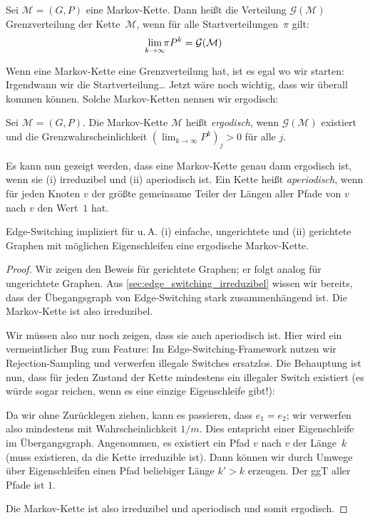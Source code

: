 \begin{definition}
    Sei $\mathcal M = (G, P)$ eine Markov-Kette.
    Dann heißt die Verteilung $\mathcal G(\mathcal M)$ Grenzverteilung der Kette~$\mathcal M$, wenn für alle Startverteilungen~$\pi$ gilt:
    \begin{equation}
        \smashoperator{\lim_{k \to \infty}} \pi P^k = \mathcal G(\mathcal M)
    \end{equation}
\end{definition}

Wenn eine Markov-Kette eine Grenzverteilung hat, ist es egal wo wir starten:
Irgendwann  wir die Startverteilung\dots
Jetzt wäre noch wichtig, dass wir überall  kommen können.
Solche Markov-Ketten nennen wir ergodisch:

\begin{definition}
    Sei $\mathcal M = (G, P)$. Die Markov-Kette $\mathcal M$ heißt \emph{ergodisch}, wenn $\mathcal G(\mathcal M)$ existiert und die Grenzwahrscheinlichkeit $(\lim_{k \to \infty} P^k)_j > 0$ für alle $j$.
\end{definition}

Es kann nun gezeigt werden, dass eine Markov-Kette genau dann ergodisch ist, wenn sie (i) irreduzibel und (ii) aperiodisch ist.
Ein Kette heißt \emph{aperiodisch}, wenn für jeden Knoten $v$ der größte gemeinsame Teiler der Längen aller Pfade von $v$ nach $v$ den Wert~$1$ hat.

\begin{theorem}
    Edge-Switching impliziert für u.\,A. (i) einfache, ungerichtete und (ii) gerichtete Graphen mit möglichen Eigenschleifen eine ergodische Markov-Kette.
\end{theorem}

\begin{proof}
    Wir zeigen den Beweis für gerichtete Graphen; er folgt analog für ungerichtete Graphen.
    Aus \cref{sec:edge_switching_irreduzibel} wissen wir bereits, dass der Übegangsgraph von Edge-Switching stark zusammenhängend ist.
    Die Markov-Kette ist also irreduzibel.

    Wir müssen also nur noch zeigen, dass sie auch aperiodisch ist.
    Hier wird ein vermeintlicher Bug zum Feature:
    Im Edge-Switching-Framework nutzen wir Rejection-Sampling und verwerfen illegale Switches ersatzlos.
    Die Behauptung ist nun, dass für jeden Zustand der Kette mindestens ein illegaler Switch existiert (es würde sogar reichen, wenn es eine einzige Eigenschleife gibt!):

    Da wir ohne Zurücklegen ziehen, kann es passieren, dass $e_1 = e_2$; wir verwerfen also mindestens mit Wahrscheinlichkeit $1 / m$.
    Dies entspricht einer Eigenschleife im Übergangsgraph.
    Angenommen, es existiert ein Pfad $v$ nach $v$ der Länge~$k$ (muss existieren, da die Kette irreduzible ist).
    Dann können wir durch Umwege über Eigenschleifen einen Pfad beliebiger Länge $k' > k$ erzeugen.
    Der ggT aller Pfade ist $1$.

    Die Markov-Kette ist also irreduzibel und aperiodisch und somit ergodisch.
\end{proof}

